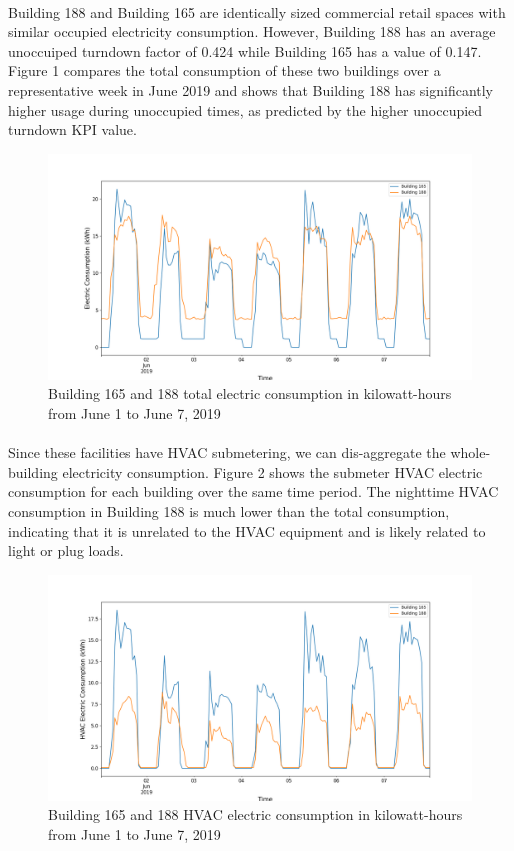 \documentclass[a4paper]{article}
\begin{document}
\paragraph{}
Building 188 and Building 165 are identically sized commercial retail spaces with similar occupied electricity consumption. However, Building 188 has an average unoccuiped turndown factor of 0.424 while Building 165 has a value of 0.147. Figure 1 compares the total consumption of these two buildings over a representative week in June 2019 and shows that Building 188 has significantly higher usage during unoccupied times, as predicted by the higher unoccupied turndown KPI value.

\begin{figure}[H]
\centering
\includegraphics[width=.9\columnwidth]{./images/188v165_Turndown.png}
\caption{Building 165 and 188 total electric consumption in kilowatt-hours from June 1 to June 7, 2019}
\end{figure}

\paragraph{}
Since these facilities have HVAC submetering, we can dis-aggregate the whole-building electricity consumption. Figure 2 shows the submeter HVAC electric consumption for each building over the same time period. The nighttime HVAC consumption in Building 188 is much lower than the total consumption, indicating that it is unrelated to the HVAC equipment and is likely related to light or plug loads.

\begin{figure}[H]
\centering
\includegraphics[width=.9\columnwidth]{./images/188v165_Turndown_HVAC.png}
\caption{Building 165 and 188 HVAC electric consumption in kilowatt-hours from June 1 to June 7, 2019}
\end{figure}
\end{document}
